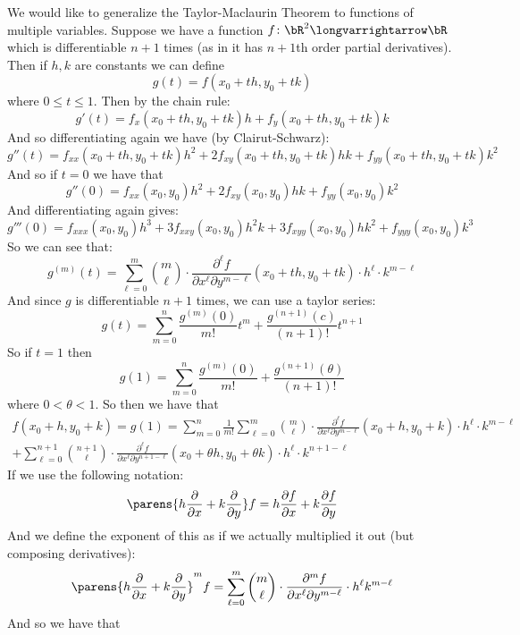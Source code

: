 \documentclass[10pt]{article}
\begin{document}


\bigskip

We would like to generalize the Taylor-Maclaurin Theorem to functions of multiple variables.
Suppose we have a function $f\colon\bR^2\longvarrightarrow\bR$ which is differentiable $n+1$ times (as in it has $n+1$th order partial derivatives).
Then if $h,k$ are constants we can define
\[ g(t) = f(x_0+th, y_0+tk) \]
where $0\leq t\leq1$.
Then by the chain rule:
\[ g'(t) = f_x(x_0+th,y_0+tk)h + f_y(x_0+th,y_0+tk)k \]
And so differentiating again we have (by Clairut-Schwarz):
\[ g''(t) = f_{xx}(x_0+th,y_0+tk)h^2 + 2f_{xy}(x_0+th,y_0+tk)hk + f_{yy}(x_0+th,y_0+tk)k^2 \]
And so if $t=0$ we have that
\[ g''(0) = f_{xx}(x_0,y_0)h^2 + 2f_{xy}(x_0,y_0)hk + f_{yy}(x_0,y_0)k^2 \]
And differentiating again gives:
\[ g'''(0) = f_{xxx}(x_0,y_0)h^3 + 3f_{xxy}(x_0,y_0)h^2k + 3f_{xyy}(x_0,y_0)hk^2 + f_{yyy}(x_0,y_0)k^3 \]
So we can see that:
\[ g^{(m)}(t) = \sum_{\ell=0}^m \binom m\ell\cdot \frac{\partial^\ell f}{\partial x^\ell\partial y^{m-\ell}}(x_0+th,y_0+tk)\cdot h^\ell\cdot k^{m-\ell} \]
And since $g$ is differentiable $n+1$ times, we can use a taylor series:
\[ g(t) = \sum_{m=0}^n\frac{g^{(m)}(0)}{m!}t^m + \frac{g^{(n+1)}(c)}{(n+1)!}t^{n+1} \]
So if $t=1$ then
\[ g(1) = \sum_{m=0}^n\frac{g^{(m)}(0)}{m!} + \frac{g^{(n+1)}(\theta)}{(n+1)!} \]
where $0<\theta<1$.
So then we have that
\begin{multline*}
f(x_0+h,y_0+k) = g(1) = \sum_{m=0}^n\frac1{m!}\sum_{\ell=0}^m \binom m\ell\cdot \frac{\partial^\ell f}{\partial x^\ell\partial y^{m-\ell}}(x_0+h,y_0+k)\cdot h^\ell\cdot k^{m-\ell} \\
+ \sum_{\ell=0}^{n+1} \binom{n+1}\ell\cdot \frac{\partial^\ell f}{\partial x^\ell\partial y^{n+1-\ell}}(x_0+\theta h,y_0+\theta k)\cdot h^\ell\cdot k^{n+1-\ell} 
\end{multline*}
If we use the following notation:
\[ \parens{h\frac\partial{\partial x}+k\frac\partial{\partial y}}f = h\frac{\partial f}{\partial x} + k\frac{\partial f}{\partial y} \]
And we define the exponent of this as if we actually multiplied it out (but composing derivatives):
\[ \parens{h\frac\partial{\partial x}+k\frac\partial{\partial y}}^mf = \sum_{\ell=0}^m\binom m\ell\cdot\frac{\partial^mf}{\partial x^\ell\partial y^{m-\ell}}\cdot h^\ell k^{m-\ell} \]
And so we have that
\end{document}
